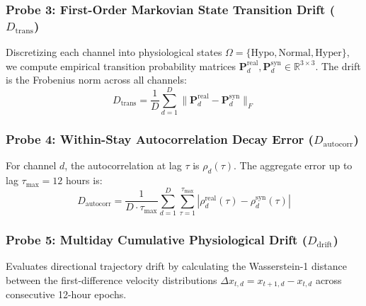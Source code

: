\documentclass[journal]{IEEEtran}
\begin{document}
\subsubsection{Probe 3: First-Order Markovian State Transition Drift ($D_{\text{trans}}$)}
Discretizing each channel into physiological states $\Omega = \{\text{Hypo}, \text{Normal}, \text{Hyper}\}$, we compute empirical transition probability matrices $\mathbf{P}_d^{\text{real}}, \mathbf{P}_d^{\text{syn}} \in \mathbb{R}^{3 \times 3}$. The drift is the Frobenius norm across all channels:
\begin{equation}
D_{\text{trans}} = \frac{1}{D} \sum_{d=1}^D \|\mathbf{P}_d^{\text{real}} - \mathbf{P}_d^{\text{syn}}\|_F
\end{equation}

\subsubsection{Probe 4: Within-Stay Autocorrelation Decay Error ($D_{\text{autocorr}}$)}
For channel $d$, the autocorrelation at lag $\tau$ is $\rho_d(\tau)$. The aggregate error up to lag $\tau_{\max} = 12$ hours is:
\begin{equation}
D_{\text{autocorr}} = \frac{1}{D \cdot \tau_{\max}} \sum_{d=1}^D \sum_{\tau=1}^{\tau_{\max}} |\rho_d^{\text{real}}(\tau) - \rho_d^{\text{syn}}(\tau)|
\end{equation}

\subsubsection{Probe 5: Multiday Cumulative Physiological Drift ($D_{\text{drift}}$)}
Evaluates directional trajectory drift by calculating the Wasserstein-1 distance between the first-difference velocity distributions $\Delta x_{t, d} = x_{t+1, d} - x_{t, d}$ across consecutive 12-hour epochs.
\end{document}
